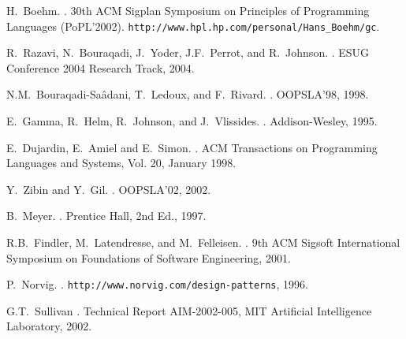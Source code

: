 \documentclass[preprint,10pt]{sigplanconf}
\begin{document}
\begin{thebibliography}{10}
H.~Boehm.
.
\newblock 30th ACM Sigplan Symposium on Principles of Programming Languages (PoPL'2002).
\newblock \verb!http://www.hpl.hp.com/personal/Hans_Boehm/gc!.


R.~Razavi, N.~Bouraqadi, J.~Yoder, J.F.~Perrot, and R.~Johnson.
.
\newblock ESUG Conference 2004 Research Track, 2004.

N.M.~Bouraqadi-Sa\^adani, T.~Ledoux, and F.~Rivard.
.
\newblock OOPSLA'98, 1998.

E.~Gamma, R.~Helm, R.~Johnson, and J.~Vlissides.
.
\newblock Addison-Wesley, 1995.





















E.~Dujardin, E.~Amiel and E.~Simon.
.
\newblock ACM Transactions on Programming Languages and Systems, Vol. 20, January 1998.

Y.~Zibin and Y.~Gil.
.
\newblock OOPSLA'02, 2002.

B.~Meyer.
.
\newblock Prentice Hall, 2nd Ed., 1997.

R.B.~Findler, M.~Latendresse, and M.~Felleisen.
.
\newblock 9th ACM Sigsoft International Symposium on Foundations of Software Engineering, 2001.

P.~Norvig.
.
\newblock \verb!http://www.norvig.com/design-patterns!, 1996.

G.T.~Sullivan
.
\newblock Technical Report AIM-2002-005, MIT Artificial Intelligence Laboratory, 2002.




\end{thebibliography}
\end{document}
